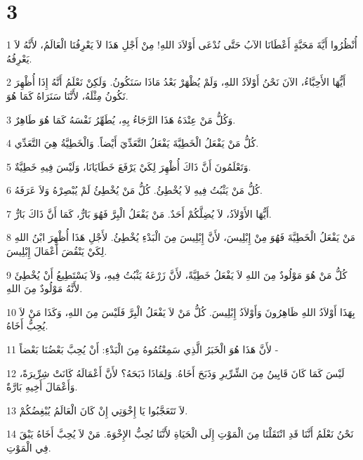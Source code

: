 \chapter{3}

\par 1 أُنْظُرُوا أَيَّةَ مَحَبَّةٍ أَعْطَانَا الآبُ حَتَّى نُدْعَى أَوْلاَدَ اللهِ! مِنْ أَجْلِ هَذَا لاَ يَعْرِفُنَا الْعَالَمُ، لأَنَّهُ لاَ يَعْرِفُهُ.
\par 2 أَيُّهَا الأَحِبَّاءُ، الآنَ نَحْنُ أَوْلاَدُ اللهِ، وَلَمْ يُظْهَرْ بَعْدُ مَاذَا سَنَكُونُ. وَلَكِنْ نَعْلَمُ أَنَّهُ إِذَا أُظْهِرَ نَكُونُ مِثْلَهُ، لأَنَّنَا سَنَرَاهُ كَمَا هُوَ.
\par 3 وَكُلُّ مَنْ عِنْدَهُ هَذَا الرَّجَاءُ بِهِ، يُطَهِّرُ نَفْسَهُ كَمَا هُوَ طَاهِرٌ.
\par 4 كُلُّ مَنْ يَفْعَلُ الْخَطِيَّةَ يَفْعَلُ التَّعَدِّيَ أَيْضاً. وَالْخَطِيَّةُ هِيَ التَّعَدِّي.
\par 5 وَتَعْلَمُونَ أَنَّ ذَاكَ أُظْهِرَ لِكَيْ يَرْفَعَ خَطَايَانَا، وَلَيْسَ فِيهِ خَطِيَّةٌ.
\par 6 كُلُّ مَنْ يَثْبُتُ فِيهِ لاَ يُخْطِئُ. كُلُّ مَنْ يُخْطِئُ لَمْ يُبْصِرْهُ وَلاَ عَرَفَهُ.
\par 7 أَيُّهَا الأَوْلاَدُ، لاَ يُضِلَّكُمْ أَحَدٌ. مَنْ يَفْعَلُ الْبِرَّ فَهُوَ بَارٌّ، كَمَا أَنَّ ذَاكَ بَارٌّ.
\par 8 مَنْ يَفْعَلُ الْخَطِيَّةَ فَهُوَ مِنْ إِبْلِيسَ، لأَنَّ إِبْلِيسَ مِنَ الْبَدْءِ يُخْطِئُ. لأَجْلِ هَذَا أُظْهِرَ ابْنُ اللهِ لِكَيْ يَنْقُضَ أَعْمَالَ إِبْلِيسَ.
\par 9 كُلُّ مَنْ هُوَ مَوْلُودٌ مِنَ اللهِ لاَ يَفْعَلُ خَطِيَّةً، لأَنَّ زَرْعَهُ يَثْبُتُ فِيهِ، وَلاَ يَسْتَطِيعُ أَنْ يُخْطِئَ لأَنَّهُ مَوْلُودٌ مِنَ اللهِ.
\par 10 بِهَذَا أَوْلاَدُ اللهِ ظَاهِرُونَ وَأَوْلاَدُ إِبْلِيسَ. كُلُّ مَنْ لاَ يَفْعَلُ الْبِرَّ فَلَيْسَ مِنَ اللهِ، وَكَذَا مَنْ لاَ يُحِبُّ أَخَاهُ.
\par 11 لأَنَّ هَذَا هُوَ الْخَبَرُ الَّذِي سَمِعْتُمُوهُ مِنَ الْبَدْءِ: أَنْ يُحِبَّ بَعْضُنَا بَعْضاً -
\par 12 لَيْسَ كَمَا كَانَ قَايِينُ مِنَ الشِّرِّيرِ وَذَبَحَ أَخَاهُ. وَلِمَاذَا ذَبَحَهُ؟ لأَنَّ أَعْمَالَهُ كَانَتْ شِرِّيرَةً، وَأَعْمَالَ أَخِيهِ بَارَّةٌ.
\par 13 لاَ تَتَعَجَّبُوا يَا إِخْوَتِي إِنْ كَانَ الْعَالَمُ يُبْغِضُكُمْ.
\par 14 نَحْنُ نَعْلَمُ أَنَّنَا قَدِ انْتَقَلْنَا مِنَ الْمَوْتِ إِلَى الْحَيَاةِ لأَنَّنَا نُحِبُّ الإِخْوَةَ. مَنْ لاَ يُحِبَّ أَخَاهُ يَبْقَ فِي الْمَوْتِ.
